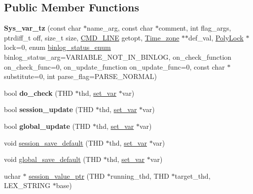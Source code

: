 \subsection*{Public Member Functions}
\begin{DoxyCompactItemize}
\item 
\mbox{\label{classSys__var__tz_a52c2a3e3281fab4d2a1a4b562c127949}} 
{\bfseries Sys\+\_\+var\+\_\+tz} (const char $\ast$name\+\_\+arg, const char $\ast$comment, int flag\+\_\+args, ptrdiff\+\_\+t off, size\+\_\+t size, \mbox{\hyperlink{structCMD__LINE}{C\+M\+D\+\_\+\+L\+I\+NE}} getopt, \mbox{\hyperlink{classTime__zone}{Time\+\_\+zone}} $\ast$$\ast$def\+\_\+val, \mbox{\hyperlink{classPolyLock}{Poly\+Lock}} $\ast$lock=0, enum \mbox{\hyperlink{classsys__var_a664520ec82191888717c86085bfa83ce}{binlog\+\_\+status\+\_\+enum}} binlog\+\_\+status\+\_\+arg=V\+A\+R\+I\+A\+B\+L\+E\+\_\+\+N\+O\+T\+\_\+\+I\+N\+\_\+\+B\+I\+N\+L\+OG, on\+\_\+check\+\_\+function on\+\_\+check\+\_\+func=0, on\+\_\+update\+\_\+function on\+\_\+update\+\_\+func=0, const char $\ast$substitute=0, int parse\+\_\+flag=P\+A\+R\+S\+E\+\_\+\+N\+O\+R\+M\+AL)
\item 
\mbox{\label{classSys__var__tz_a6f8e6bbff94289a9d2749a1429a0d3c3}} 
bool {\bfseries do\+\_\+check} (T\+HD $\ast$thd, \mbox{\hyperlink{classset__var}{set\+\_\+var}} $\ast$var)
\item 
\mbox{\label{classSys__var__tz_aa0b4ff4bed92656316bbff06b34aaa24}} 
bool {\bfseries session\+\_\+update} (T\+HD $\ast$thd, \mbox{\hyperlink{classset__var}{set\+\_\+var}} $\ast$var)
\item 
\mbox{\label{classSys__var__tz_af6ce265001f2a2ac2fc5069cee8d5cde}} 
bool {\bfseries global\+\_\+update} (T\+HD $\ast$thd, \mbox{\hyperlink{classset__var}{set\+\_\+var}} $\ast$var)
\item 
void \mbox{\hyperlink{classSys__var__tz_a8cbe07b66a7cd2098251817f06cb465c}{session\+\_\+save\+\_\+default}} (T\+HD $\ast$thd, \mbox{\hyperlink{classset__var}{set\+\_\+var}} $\ast$var)
\item 
void \mbox{\hyperlink{classSys__var__tz_ac1b0b8a24189b13a4b5d3798ac8aed1a}{global\+\_\+save\+\_\+default}} (T\+HD $\ast$thd, \mbox{\hyperlink{classset__var}{set\+\_\+var}} $\ast$var)
\item 
uchar $\ast$ \mbox{\hyperlink{classSys__var__tz_a3c4cd63eee52952ee17acf95f5f9b05b}{session\+\_\+value\+\_\+ptr}} (T\+HD $\ast$running\+\_\+thd, T\+HD $\ast$target\+\_\+thd, L\+E\+X\+\_\+\+S\+T\+R\+I\+NG $\ast$base)
$$
\end{DoxyCompactItemize}
